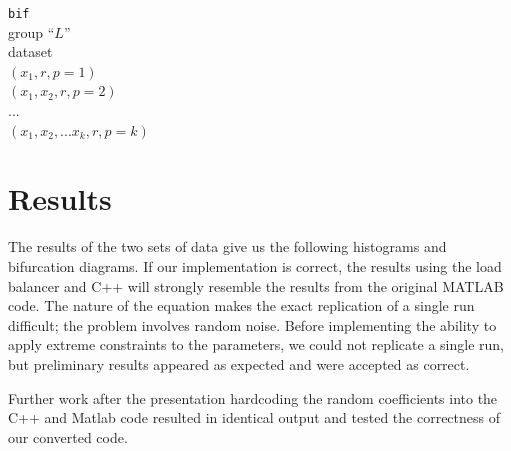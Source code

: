 \documentclass[12pt]{article}
\begin{document}
\begin{tabbing}
\texttt{bif}\\
  \hspace{5mm} group ``$L$'' \\
  \hspace{10mm} dataset \\
  \hspace{15mm} $ (x_{1}, r, p=1)$ \\
  \hspace{15mm} $ (x_{1},x_2, r, p=2)$ \\
  \hspace{15mm} ... \\
  \hspace{15mm} $ (x_{1},x_2,...x_k, r, p=k)$ \\
\end{tabbing}

\section{Results}
\hspace{5mm} The results of the two sets of data give us the following
histograms and bifurcation diagrams. If our implementation is correct,
the results using the load balancer and C++ will strongly resemble the
results from the original MATLAB code. The nature of the equation
makes the exact replication of a single run difficult; the problem
involves random noise. Before implementing the ability to apply
extreme constraints to the parameters, we could not replicate a single
run, but preliminary results appeared as expected and were accepted as
correct.  

Further work after the presentation hardcoding the random coefficients into the C++ and Matlab code resulted in identical output and tested the correctness of our converted code.
\end{document}
